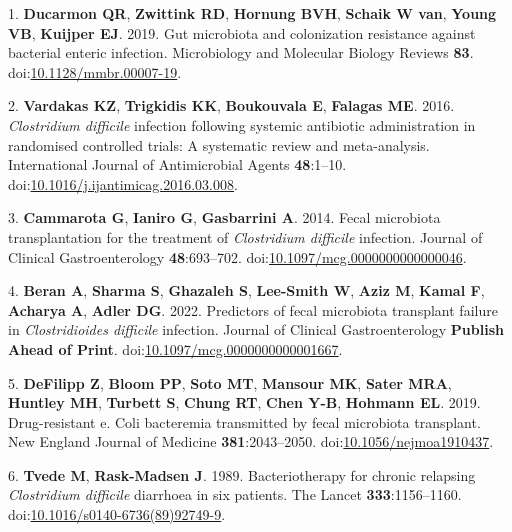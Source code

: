\documentclass[
  12pt,
]{article}
\newenvironment{cslreferences}%
  {}%
  {\par}
\begin{document}
\hypertarget{refs}{}
\begin{cslreferences}
\leavevmode\hypertarget{ref-Ducarmon2019}{}%
1. \textbf{Ducarmon QR}, \textbf{Zwittink RD}, \textbf{Hornung BVH},
\textbf{Schaik W van}, \textbf{Young VB}, \textbf{Kuijper EJ}. 2019. Gut
microbiota and colonization resistance against bacterial enteric
infection. Microbiology and Molecular Biology Reviews \textbf{83}.
doi:\href{https://doi.org/10.1128/mmbr.00007-19}{10.1128/mmbr.00007-19}.

\leavevmode\hypertarget{ref-Vardakas2016}{}%
2. \textbf{Vardakas KZ}, \textbf{Trigkidis KK}, \textbf{Boukouvala E},
\textbf{Falagas ME}. 2016. \emph{Clostridium difficile} infection
following systemic antibiotic administration in randomised controlled
trials: A systematic review and meta-analysis. International Journal of
Antimicrobial Agents \textbf{48}:1--10.
doi:\href{https://doi.org/10.1016/j.ijantimicag.2016.03.008}{10.1016/j.ijantimicag.2016.03.008}.

\leavevmode\hypertarget{ref-Cammarota2014}{}%
3. \textbf{Cammarota G}, \textbf{Ianiro G}, \textbf{Gasbarrini A}. 2014.
Fecal microbiota transplantation for the treatment of \emph{Clostridium
difficile} infection. Journal of Clinical Gastroenterology
\textbf{48}:693--702.
doi:\href{https://doi.org/10.1097/mcg.0000000000000046}{10.1097/mcg.0000000000000046}.

\leavevmode\hypertarget{ref-Beran2022}{}%
4. \textbf{Beran A}, \textbf{Sharma S}, \textbf{Ghazaleh S},
\textbf{Lee-Smith W}, \textbf{Aziz M}, \textbf{Kamal F}, \textbf{Acharya
A}, \textbf{Adler DG}. 2022. Predictors of fecal microbiota transplant
failure in \emph{Clostridioides difficile} infection. Journal of
Clinical Gastroenterology \textbf{Publish Ahead of Print}.
doi:\href{https://doi.org/10.1097/mcg.0000000000001667}{10.1097/mcg.0000000000001667}.

\leavevmode\hypertarget{ref-DeFilipp2019}{}%
5. \textbf{DeFilipp Z}, \textbf{Bloom PP}, \textbf{Soto MT},
\textbf{Mansour MK}, \textbf{Sater MRA}, \textbf{Huntley MH},
\textbf{Turbett S}, \textbf{Chung RT}, \textbf{Chen Y-B},
\textbf{Hohmann EL}. 2019. Drug-resistant e. Coli bacteremia transmitted
by fecal microbiota transplant. New England Journal of Medicine
\textbf{381}:2043--2050.
doi:\href{https://doi.org/10.1056/nejmoa1910437}{10.1056/nejmoa1910437}.

\leavevmode\hypertarget{ref-Tvede1989}{}%
6. \textbf{Tvede M}, \textbf{Rask-Madsen J}. 1989. Bacteriotherapy for
chronic relapsing \emph{Clostridium difficile} diarrhoea in six
patients. The Lancet \textbf{333}:1156--1160.
doi:\href{https://doi.org/10.1016/s0140-6736(89)92749-9}{10.1016/s0140-6736(89)92749-9}.


\end{cslreferences}
\end{document}
